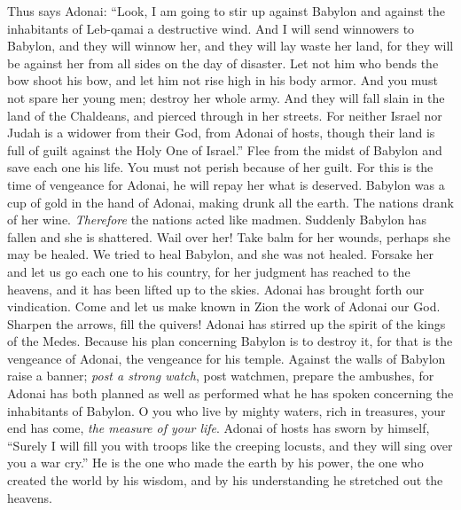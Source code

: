 \begin{biblechapter} %
\verse Thus says Adonai:
\verse “Look, I am going to stir up against Babylon 
and against the inhabitants of Leb-qamai a destructive wind.
\verse And I will send winnowers to Babylon, 
and they will winnow her, 
and they will lay waste her land, 
for they will be against her from all sides on the day of disaster.
\verse Let not him who bends the bow shoot his bow, 
and let him not rise high in his body armor. 
And you must not spare her young men; 
destroy her whole army.
\verse And they will fall slain in the land of the Chaldeans, 
and pierced through in her streets.
\verse For neither Israel nor Judah is a widower from their God, 
from Adonai of hosts, 
though their land is full of guilt 
against the Holy One of Israel.”
\verse Flee from the midst of Babylon and save each one his life. 
You must not perish because of her guilt. 
For this is the time of vengeance for Adonai, 
he will repay her what is deserved.
\verse Babylon was a cup of gold in the hand of Adonai, 
making drunk all the earth. 
The nations drank of her wine. 
\textit{Therefore} the nations acted like madmen.
\verse Suddenly Babylon has fallen and she is shattered. 
Wail over her! 
Take balm for her wounds, 
perhaps she may be healed.
\verse We tried to heal Babylon, and she was not healed. 
Forsake her and let us go each one to his country, 
for her judgment has reached to the heavens, 
and it has been lifted up to the skies.
\verse Adonai has brought forth our vindication. 
Come and let us make known in Zion the work of Adonai our God.
\verse Sharpen the arrows, fill the quivers! 
Adonai has stirred up the spirit of the kings of the Medes. 
Because his plan concerning Babylon is to destroy it, 
for that is the vengeance of Adonai, 
the vengeance for his temple.
\verse Against the walls of Babylon raise a banner; 
\textit{post a strong watch}, post watchmen, prepare the ambushes, 
for Adonai has both planned as well as performed 
what he has spoken concerning the inhabitants of Babylon.
\verse O you who live by mighty waters, rich in treasures, 
your end has come, \textit{the measure of your life}.
\verse Adonai of hosts has sworn by himself, 
“Surely I will fill you with troops like the creeping locusts, 
and they will sing over you a war cry.”
\verse He is the one who made the earth by his power, 
the one who created the world by his wisdom, 
and by his understanding he stretched out the heavens.

\end{biblechapter}

